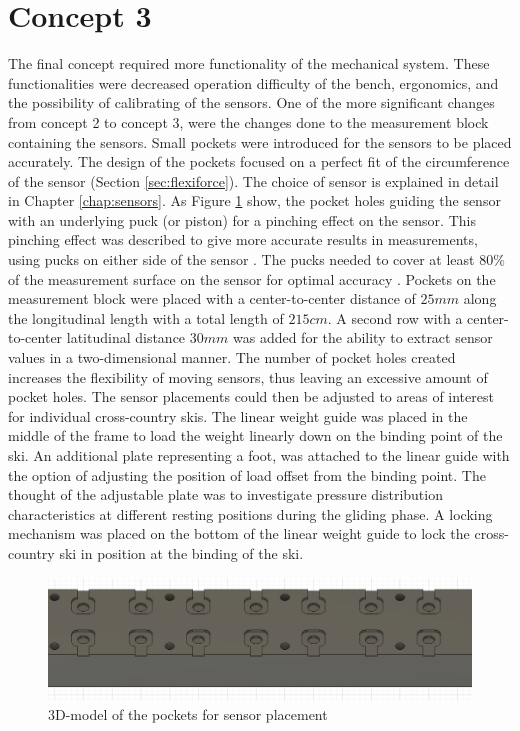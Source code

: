 \section{Concept 3}
\label{sec:concept3}
The final concept required more functionality of the mechanical system. These functionalities were decreased operation difficulty of the bench, ergonomics, and the possibility of calibrating of the sensors. One of the more significant changes from concept 2 to concept 3, were the changes done to the measurement block containing the sensors. Small pockets were introduced for the sensors to be placed accurately. The design of the pockets focused on a perfect fit of the circumference of the sensor (Section \ref{sec:flexiforce}). The choice of sensor is explained in detail in Chapter \ref{chap:sensors}. As Figure \ref{fig:3dpockets} show, the pocket holes guiding the sensor with an underlying puck (or piston) for a pinching effect on the sensor. This pinching effect was described to give more accurate results in measurements, using pucks on either side of the sensor \citep{vecchi_experimental_2000}. The pucks needed to cover at least $80\%$ of the measurement surface on the sensor for optimal accuracy \citep[10.3, p.418]{handbook}. Pockets on the measurement block were placed with a center-to-center distance of $25mm$ along the longitudinal length with a total length of $215cm$. A second row with a center-to-center latitudinal distance $30mm$ was added for the ability to extract sensor values in a two-dimensional manner. The number of pocket holes created increases the flexibility of moving sensors, thus leaving an excessive amount of pocket holes. The sensor placements could then be adjusted to areas of interest for individual cross-country skis.
The linear weight guide was placed in the middle of the frame to load the weight linearly down on the binding point of the ski. An additional plate representing a foot, was attached to the linear guide with the option of adjusting the position of load offset from the binding point. The thought of the adjustable plate was to investigate pressure distribution characteristics at different resting positions during the gliding phase.
A locking mechanism was placed on the bottom of the linear weight guide to lock the cross-country ski in position at the binding of the ski.

\begin{figure}
    \centering
    \includegraphics[width=1\textwidth]{figures/pockets.png}
    \caption{3D-model of the pockets for sensor placement}
    \label{fig:3dpockets}
\end{figure}


